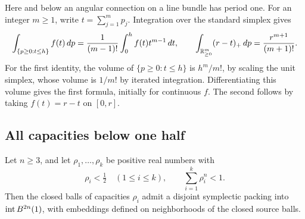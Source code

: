 Here and below an angular connection on a line bundle has period one.
For an integer $m\ge1$, write $t=\sum_{j=1}^m p_j$. Integration over the
standard simplex gives
\begin{equation}\label{app:simplex-integrals}
 \int_{\{p\ge0:t\le h\}}f(t)\,dp
 =\frac1{(m-1)!}\int_0^h f(t)t^{m-1}\,dt,
 \qquad
 \int_{\mathbb R_{\ge0}^m}(r-t)_+\,dp=\frac{r^{m+1}}{(m+1)!}.
\end{equation}
For the first identity, the volume of $\{p\ge0:t\le h\}$ is $h^m/m!$,
by scaling the unit simplex, whose volume is $1/m!$ by iterated integration.
Differentiating this volume gives the first formula, initially for
continuous $f$. The second follows by taking $f(t)=r-t$ on $[0,r]$.

\subsection{All capacities below one half}

\begin{proposition}\label{app:small}
Let $n\ge3$, and let $\rho_1,\ldots,\rho_k$ be positive real numbers with
\[
 \rho_i<\tfrac12\quad(1\le i\le k),\qquad
 \sum_{i=1}^k\rho_i^n<1.
\]
Then the closed balls of capacities $\rho_i$ admit a disjoint symplectic
packing into $\operatorname{int} B^{2n}(1)$, with embeddings defined on neighborhoods
of the closed source balls.
\end{proposition}

